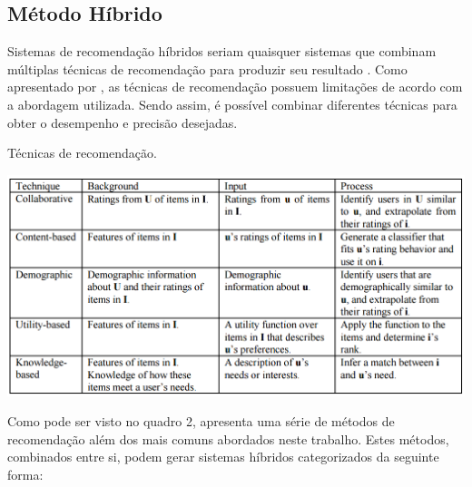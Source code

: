 \documentclass[12pt, openright, oneside, a4paper, brazil]{abntex2}
\begin{document}
\subsection{Método Híbrido}

Sistemas de recomendação híbridos seriam quaisquer sistemas que combinam múltiplas técnicas de recomendação para produzir seu resultado \cite{burke2002hybrid, burke2007hybrid}. Como apresentado por , as técnicas de recomendação possuem limitações de acordo com a abordagem utilizada. Sendo assim, é possível combinar diferentes técnicas para obter o desempenho e precisão desejadas.

\begin{quadro}[h!tp]
	\caption{\label{recommender_systems}Técnicas de recomendação.}

	\begin{center}
		\includegraphics[scale=0.6]{images/recommender_systems.png}
	\end{center}
\end{quadro}

Como pode ser visto no quadro 2,  apresenta uma série de métodos de recomendação além dos mais comuns abordados neste trabalho. Estes métodos, combinados entre si, podem gerar sistemas híbridos categorizados da seguinte forma:
\end{document}

